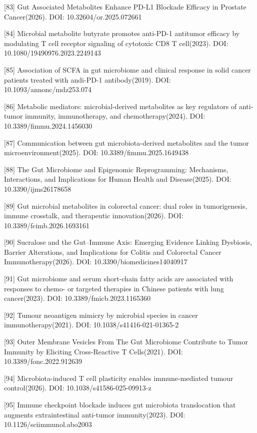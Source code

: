 \documentclass[11pt]{article}
\begin{document}
{[}83{]} Gut Associated Metabolites Enhance PD-L1 Blockade Efficacy in Prostate Cancer(2026). DOI: 10.32604/or.2025.072661

{[}84{]} Microbial metabolite butyrate promotes anti-PD-1 antitumor efficacy by modulating T cell receptor signaling of cytotoxic CD8 T cell(2023). DOI: 10.1080/19490976.2023.2249143

{[}85{]} Association of SCFA in gut microbiome and clinical response in solid cancer patients treated with andi-PD-1 antibody(2019). DOI: 10.1093/annonc/mdz253.074

{[}86{]} Metabolic mediators: microbial-derived metabolites as key regulators of anti-tumor immunity, immunotherapy, and chemotherapy(2024). DOI: 10.3389/fimmu.2024.1456030

{[}87{]} Communication between gut microbiota-derived metabolites and the tumor microenvironment(2025). DOI: 10.3389/fimmu.2025.1649438

{[}88{]} The Gut Microbiome and Epigenomic Reprogramming: Mechanisms, Interactions, and Implications for Human Health and Disease(2025). DOI: 10.3390/ijms26178658

{[}89{]} Gut microbial metabolites in colorectal cancer: dual roles in tumorigenesis, immune crosstalk, and therapeutic innovation(2026). DOI: 10.3389/fcimb.2026.1693161

{[}90{]} Sucralose and the Gut--Immune Axis: Emerging Evidence Linking Dysbiosis, Barrier Alterations, and Implications for Colitis and Colorectal Cancer Immunotherapy(2026). DOI: 10.3390/biomedicines14040917

{[}91{]} Gut microbiome and serum short-chain fatty acids are associated with responses to chemo- or targeted therapies in Chinese patients with lung cancer(2023). DOI: 10.3389/fmicb.2023.1165360

{[}92{]} Tumour neoantigen mimicry by microbial species in cancer immunotherapy(2021). DOI: 10.1038/s41416-021-01365-2

{[}93{]} Outer Membrane Vesicles From The Gut Microbiome Contribute to Tumor Immunity by Eliciting Cross-Reactive T Cells(2021). DOI: 10.3389/fonc.2022.912639

{[}94{]} Microbiota-induced T cell plasticity enables immune-mediated tumour control(2026). DOI: 10.1038/s41586-025-09913-z

{[}95{]} Immune checkpoint blockade induces gut microbiota translocation that augments extraintestinal anti-tumor immunity(2023). DOI: 10.1126/sciimmunol.abo2003
\end{document}
